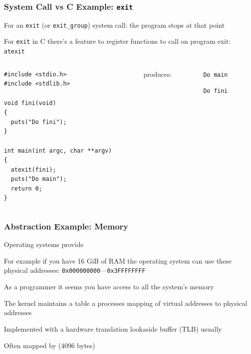 \documentclass[aspectratio=169]{beamer}
\begin{document}
  \begin{frame}[fragile]
    \frametitle{System Call vs C Example: \texttt{exit}}

    For an \texttt{exit} (or \texttt{exit\_group}) system call: the program
    stops at that point

    \vspace{1em}

    For \texttt{exit} in C there's a feature to register functions to call
    on program exit: \texttt{atexit}

    \vspace{1em}

    \begin{columns}
      \begin{column}{0.4\textwidth}
        \begin{lstlisting}[basicstyle=\ttfamily\footnotesize]
#include <stdio.h>
#include <stdlib.h>

void fini(void)
{
  puts("Do fini");
}

int main(int argc, char **argv)
{
  atexit(fini);
  puts("Do main");
  return 0;
}
        \end{lstlisting}
      \end{column}
      \begin{column}{0.13\textwidth}
        produces:
      \end{column}
      \begin{column}{0.13\textwidth}
        \texttt{Do main}

        \texttt{Do fini}
      \end{column}
    \end{columns}
  \end{frame}

  \begin{frame}
    \frametitle{Abstraction Example: Memory}

    Operating systems provide 

    \vspace{1em}

    For example if you have 16 GiB of RAM the operating system can use these
    physical addresses: \texttt{0x000000000}---\texttt{0x3FFFFFFFF}

    \vspace{1em}

    As a programmer it seems you have access to all the system's memory

    \vspace{1em}

    The kernel maintains a table a processes mapping of virtual addresses to
    physical addresses

    \hspace{1em} Implemented with a hardware translation lookaside buffer (TLB)
                 usually

    \hspace{1em} Often mapped by  (4096 bytes)
  \end{frame}
\end{document}

